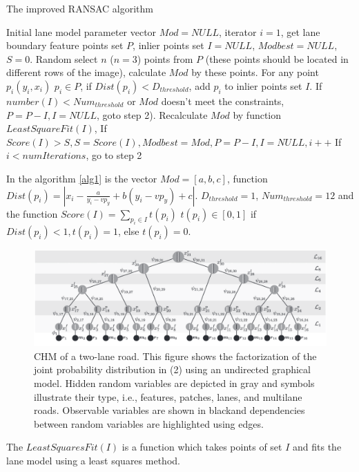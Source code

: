\documentclass[conference]{IEEEtran}
\begin{document}
\begin{algorithm}
\caption{The improved RANSAC algorithm}
\label{alg1}
\begin{algorithmic}[1]
\State Initial lane model parameter vector $Mod=NULL$, iterator $i=1$, get lane boundary feature points set $P$, inlier points set $I=NULL$, $Modbest=NULL$, $S=0$. \linebreak
\State Random select $n$ ($n=3$) points from $P$ (these points should be located in different rows of the image), calculate $Mod$ by these points.
\State For any point $p_i(y_i,x_i)$ $p_i \in P $, if $Dist(p_i)<D_{threshold}$, add $p_i$ to inlier points set $I$.
\State If $number(I) < Num_{threshold}$ or $Mod$ doesn't meet the constraints, $P=P-I,I=NULL$, goto step 2).
\State Recalculate $Mod$ by function $LeastSquareFit(I)$, If $Score(I)>S, S=Score(I), Modbest=Mod, P=P-I, I=NULL, i++$
\State If $i < numIterations$, go to step 2
\end{algorithmic}

\end{algorithm} 

In the algorithm \ref{alg1} is the vector $Mod = [a,b,c]$, function $Dist(p_i) = |x_i - \frac{a}{y_i - vp_y} + b(y_i - vp_y)+ c|$. $D_{threshold} = 1$, $Num_{threshold} = 12$ and the function $Score(I) = \sum_{p_i \in I}t(p_i)$ 
$t(p_i) \in [0,1]$ if $Dist(p_i) < 1, t(p_i) = 1$, else $t(p_i)=0$.

\begin{figure}
	\centering
    \includegraphics[scale = 0.4]{pictures/tree.pdf}
	\caption{CHM of a two-lane road. This figure shows the factorization of the joint probability distribution in (2) using an undirected graphical model. Hidden random variables are depicted in gray and symbols illustrate their type, i.e., features, patches, lanes, and multilane roads. Observable variables are shown in blackand dependencies between random variables are highlighted using edges. \cite{lanesystem}}
	\label{fig10}
\end{figure}

The $LeastSquaresFit(I)$ is a function which takes points of set $I$ and fits the lane model using a least squares method.
\end{document}
